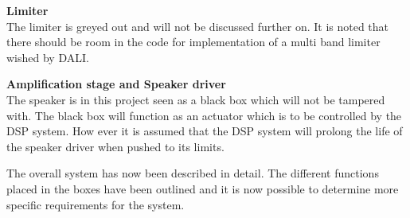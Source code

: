 \textbf{Limiter} \\
The limiter is greyed out and will not be discussed further on. It is noted that there should be room in the code for implementation of a multi band limiter wished by DALI.

\textbf{Amplification stage and Speaker driver} \\
The speaker is in this project seen as a black box which will not be tampered with. The black box will function as an actuator which is to be controlled by the DSP system. How ever it is assumed that the DSP system will prolong the life of the speaker driver when pushed to its limits.


\vspace{5mm}
The overall system has now been described in detail. The different functions placed in the boxes have been outlined and it is now possible to determine more specific requirements for the system.
